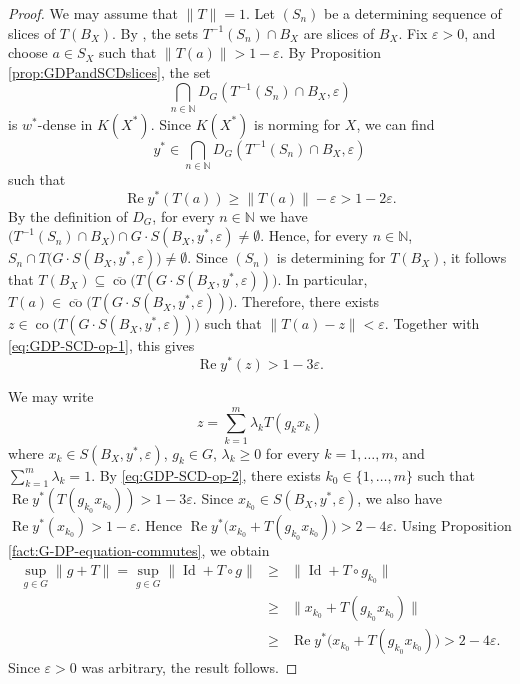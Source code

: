 \documentclass[a4paper,12pt]{amsart}
\theoremstyle{definition}
\theoremstyle{definition}
\theoremstyle{remark}
\numberwithin{equation}{section}
\newcommand{\N}{\mathbb{N}}
\DeclareMathOperator{\co}{co}
\DeclareMathOperator{\re}{Re}
\DeclareMathOperator{\id}{Id}
\renewcommand{\geq}{\geqslant}
\newcommand{\<}{\langle}
\renewcommand{\>}{\rangle}
\newcommand{\e}{\varepsilon}
\begin{document}
	\begin{proof}
		We may assume that $\|T\|=1$.
		Let $(S_n)$ be a determining sequence of slices of $T(B_X)$.
		By \cite[Proposition 2.6.5]{KMRW}, the sets $T^{-1}(S_n)\cap B_X$ are slices of $B_X$. Fix $\e>0$, and choose $a \in S_X$ such that $\|T(a)\| > 1-\e$. By Proposition \ref{prop:GDPandSCDslices}, the set
		\begin{equation*}
			\bigcap_{n \in \N} D_G(T^{-1}(S_n)\cap B_X,\e)
		\end{equation*}
		is $w^*$-dense in $K(X^*)$.
		Since $K(X^*)$ is norming for $X$, we can find
		\begin{equation*}
			y^* \in \bigcap_{n \in \N} D_G(T^{-1}(S_n)\cap B_X,\e)
		\end{equation*}
		such that
		\begin{equation} \label{eq:GDP-SCD-op-1}
			\re y^*(T(a)) \geq \|T(a)\|-\e > 1-2\e.
		\end{equation}
		By the definition of $D_G$, for every $n \in \N$ we have $\bigl(T^{-1}(S_n)\cap B_X\bigr)\cap G\cdot S(B_X,y^*,\e)\not=\emptyset$. Hence, for every $n \in \N$, $S_n \cap T\bigl(G\cdot S(B_X,y^*,\e)\bigr)\not=\emptyset$. Since $(S_n)$ is determining for $T(B_X)$, it follows that $T(B_X)\subseteq \overline{\co}\bigl(T(G\cdot S(B_X,y^*,\e))\bigr)$. In particular, $T(a)\in \overline{\co}\bigl(T(G\cdot S(B_X,y^*,\e))\bigr)$. Therefore, there exists $z \in \co\bigl(T(G\cdot S(B_X,y^*,\e))\bigr)$ such that $\|T(a)-z\|<\e$. Together with \eqref{eq:GDP-SCD-op-1}, this gives
		\begin{equation} \label{eq:GDP-SCD-op-2}
			\re y^*(z) > 1-3\e.
		\end{equation}
		
		We may write
		\begin{equation*}
			z=\sum_{k=1}^m \lambda_k T(g_kx_k)
		\end{equation*}
		where $x_k \in S(B_X,y^*,\e)$, $g_k \in G$, $\lambda_k \geq 0$ for every $k=1,\ldots,m$, and $\sum_{k=1}^m \lambda_k=1$.
		By \eqref{eq:GDP-SCD-op-2}, there exists $k_0 \in \{1,\ldots,m\}$ such that $\re y^*(T(g_{k_0}x_{k_0})) > 1-3\e$. Since $x_{k_0} \in S(B_X,y^*,\e)$, we also have $\re y^*(x_{k_0}) > 1-\e$. Hence $\re y^*\bigl(x_{k_0}+T(g_{k_0}x_{k_0})\bigr) > 2-4\e$. Using Proposition \ref{fact:G-DP-equation-commutes}, we obtain
		\begin{eqnarray*}
			\sup_{g \in G} \|g + T\|
			= \sup_{g \in G} \|\id + T \circ g\|
			&\geq&
			\|\id + T\circ g_{k_0}\| \\
			&\geq&
			\|x_{k_0}+T(g_{k_0}x_{k_0})\| \\
			&\geq&
			\re y^*\bigl(x_{k_0}+T(g_{k_0}x_{k_0})\bigr)
			>
			2-4\e.
		\end{eqnarray*}
		Since $\e>0$ was arbitrary, the result follows.
	\end{proof}
	
\end{document}
